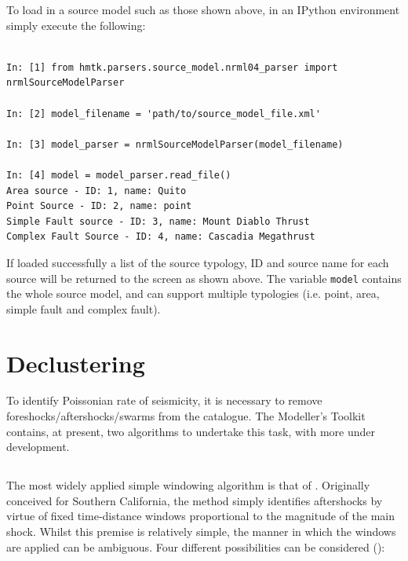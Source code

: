 To load in a source model such as those shown above, in an IPython environment simply execute the following:

\begin{Verbatim}[frame=single, commandchars=\\\{\}, fontsize=\scriptsize, samepage=true]

In: [1] from hmtk.parsers.source_model.nrml04_parser import nrmlSourceModelParser

In: [2] model_filename = 'path/to/source_model_file.xml'

In: [3] model_parser = nrmlSourceModelParser(model_filename)

In: [4] model = model_parser.read_file()
Area source - ID: 1, name: Quito
Point Source - ID: 2, name: point
Simple Fault source - ID: 3, name: Mount Diablo Thrust
Complex Fault Source - ID: 4, name: Cascadia Megathrust

\end{Verbatim}

If loaded successfully a list of the source typology, ID and source name for each source will be returned to the screen as shown above. The variable \verb=model= contains the whole source model, and can support multiple typologies (i.e. point, area, simple fault and complex fault).


\section{Declustering}

To identify Poissonian rate of seismicity, it is necessary to remove foreshocks/aftershocks/swarms from the catalogue. The Modeller's Toolkit contains, at present, two algorithms to undertake this task, with more under development.

\subsection{\cite{GardnerKnopoff1974}}

The most widely applied simple windowing algorithm is that of 
\cite{GardnerKnopoff1974}. Originally conceived for Southern California, 
the method simply identifies aftershocks by virtue of fixed time-distance
windows proportional to the magnitude of the main shock. Whilst this 
premise is relatively simple, the manner in which the windows are 
applied can be ambiguous. Four different possibilities can be 
considered (\cite{LuenStark2012}):

